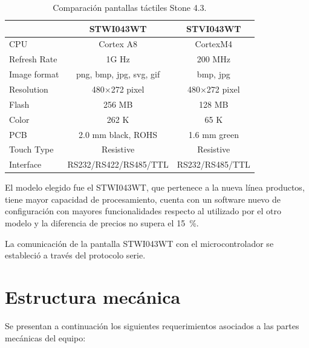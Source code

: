 \begin{table}[!ht]
	\centering
	\caption[Comparación Stone]{Comparación pantallas táctiles Stone 4.3.}
	\begin{tabular}{l c c }    
		\toprule
		\textbf{}     & \textbf{STWI043WT} & \textbf{STVI043WT} \\
		\midrule
		CPU 			& 	Cortex A8         		& 	CortexM4 			 	\\		
		Refresh Rate    & 	1G Hz         			& 	200 MHz 				\\
		Image format  	& 	png, bmp, jpg, svg, gif     & 	bmp, jpg 				\\
		Resolution		& 	480×272 pixel	        & 	480×272 pixel 			\\
		Flash  			& 	256 MB         			& 	128 MB 					\\
		Color  			& 	262 K	          		& 	65 K 					\\
		PCB 			& 	2.0 mm black, ROHS       & 	1.6 mm green 			\\
		Touch Type		& 	Resistive    			& 	Resistive				\\
		Interface 		& 	RS232/RS422/RS485/TTL   & 	RS232/RS485/TTL			\\
		\bottomrule
		\hline
	\end{tabular}
	\label{tab:tabla_stone}
\end{table}


El modelo elegido fue el STWI043WT, que pertenece a la nueva línea productos, tiene mayor capacidad de procesamiento, cuenta con un software nuevo de configuración con mayores funcionalidades respecto al utilizado por el otro modelo y la diferencia de precios no supera el \SI{15}{\percent}.  

La comunicación de la pantalla STWI043WT con el microcontrolador se estableció a través del protocolo serie.



\section{Estructura mecánica}
\label{sec:estructura_mecanica}

Se presentan a continuación los siguientes requerimientos asociados a las partes mecánicas del equipo: 

